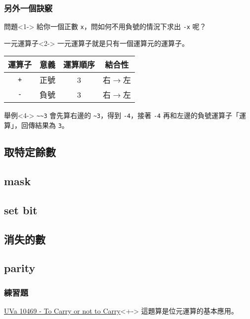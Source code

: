 \documentclass[utf8]{beamer}
\begin{document}
\begin{CJK}{UTF8}{bkai}
\begin{frame}[fragile]
  \frametitle{另外一個訣竅}
  \begin{alertblock}{問題}<1->
  給你一個正數 \lstinline{x}{}，問如何不用負號的情況下求出 \lstinline{-x}{} 呢？
  \end{alertblock}
  \begin{block}{一元運算子}<2->
    \alert{一元運算子}就是只有一個運算元的運算子。
    \pause \pause
    \begin{table}[h]
      \begin{tabular}{|c|c|c|c|}
      \hline
      運算子           & 意義 & 運算順序 & 結合性\\
      \hline
      \lstinline{+}{} & 正號 & 3      & \alert{右$\rightarrow$左}\\
      \hline
      \lstinline{-}{} & 負號 & 3      & \alert{右$\rightarrow$左}\\
      \hline
      \end{tabular}
    \end{table}
  \end{block}
  \begin{exampleblock}{舉例}<4->
  \lstinline{~~3}{} 會先算右邊的 \lstinline{~3}{}，得到 \lstinline{-4}{}，接著 \lstinline{-4}{} 再和左邊的負號運算子「運算」，回傳結果為 \lstinline{3}{}。
  \end{exampleblock}
\end{frame}

\subsection{取特定餘數}

\subsection{mask}

\subsection{set bit}

\subsection{消失的數}

\subsection{parity}

\begin{frame}
  \frametitle{練習題}
  \begin{exampleblock}{\href{http://unfortunate-dog.github.io/articles/104/p10469/}{UVa 10469 - To Carry or not to Carry}}<+->
  \label{uva:10469}
  這題算是位元運算的基本應用。
  \end{exampleblock}
\end{frame}


\end{CJK}
\end{document}
